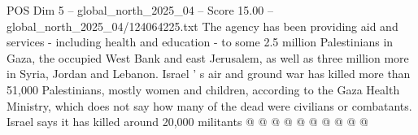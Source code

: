 \begin{textsample}{POS Dim 5 – global\_north\_2025\_04 – Score 15.00 – global\_north\_2025\_04/124064225.txt}
The agency has been providing aid and services - including health and education - to some 2.5 million Palestinians in Gaza, the occupied West Bank and east Jerusalem, as well as three million more in Syria, Jordan and Lebanon.
Israel ' s air and ground war has killed more than 51,000 Palestinians, mostly women and children, according to the Gaza Health Ministry, which does not say how many of the dead were civilians or combatants.
Israel says it has killed around 20,000 militants @ @ @ @ @ @ @ @ @ @

\end{textsample}
